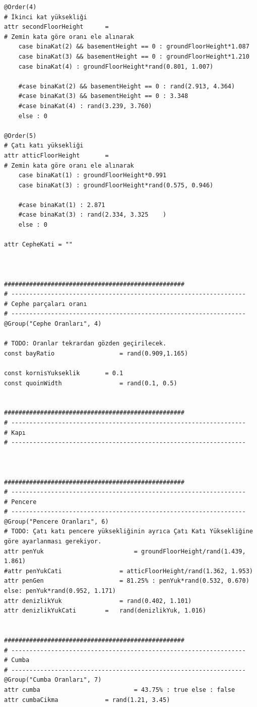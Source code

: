 \documentclass[12pt,turkish,a4paperpaper,]{report}
\begin{document}
\begin{verbatim}
@Order(4)
# İkinci kat yüksekliği
attr secondFloorHeight      =
# Zemin kata göre oranı ele alınarak
    case binaKat(2) && basementHeight == 0 : groundFloorHeight*1.087
    case binaKat(3) && basementHeight == 0 : groundFloorHeight*1.210
    case binaKat(4) : groundFloorHeight*rand(0.801, 1.007)

    #case binaKat(2) && basementHeight == 0 : rand(2.913, 4.364)
    #case binaKat(3) && basementHeight == 0 : 3.348
    #case binaKat(4) : rand(3.239, 3.760)
    else : 0

@Order(5)
# Çatı katı yüksekliği
attr atticFloorHeight       =
# Zemin kata göre oranı ele alınarak
    case binaKat(1) : groundFloorHeight*0.991
    case binaKat(3) : groundFloorHeight*rand(0.575, 0.946)

    #case binaKat(1) : 2.871
    #case binaKat(3) : rand(2.334, 3.325    )
    else : 0

attr CepheKati = ""



##################################################
# -----------------------------------------------------------------
# Cephe parçaları oranı
# -----------------------------------------------------------------
@Group("Cephe Oranları", 4)

# TODO: Oranlar tekrardan gözden geçirilecek.
const bayRatio                  = rand(0.909,1.165)

const kornisYukseklik       = 0.1
const quoinWidth                = rand(0.1, 0.5)


##################################################
# -----------------------------------------------------------------
# Kapı
# -----------------------------------------------------------------



##################################################
# -----------------------------------------------------------------
# Pencere
# -----------------------------------------------------------------
@Group("Pencere Oranları", 6)
# TODO: Çatı katı pencere yüksekliğinin ayrıca Çatı Katı Yüksekliğine göre ayarlanması gerekiyor.
attr penYuk                         = groundFloorHeight/rand(1.439, 1.861)
#attr penYukCati                = atticFloorHeight/rand(1.362, 1.953)
attr penGen                     = 81.25% : penYuk*rand(0.532, 0.670) else: penYuk*rand(0.952, 1.171)
attr denizlikYuk                = rand(0.402, 1.101)
attr denizlikYukCati        =   rand(denizlikYuk, 1.016)


##################################################
# -----------------------------------------------------------------
# Cumba
# -----------------------------------------------------------------
@Group("Cumba Oranları", 7)
attr cumba                          = 43.75% : true else : false
attr cumbaCikma             = rand(1.21, 3.45)


\end{verbatim}
\end{document}
